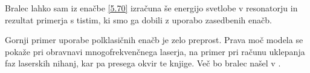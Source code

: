 Bralec lahko sam iz enačbe \ref{5.70} izračuna še energijo svetlobe v
resonatorju in rezultat primerja s tistim, ki smo ga dobili z uporabo
zasedbenih enačb.

Gornji primer uporabe polklasičnih enačb je zelo preprost. Prava moč
modela se pokaže pri obravnavi mnogofrekvenčnega laserja, na primer pri
računu uklepanja faz laserskih nihanj, kar pa presega okvir te knjige. Več
bo bralec našel v \cite{haken2}.